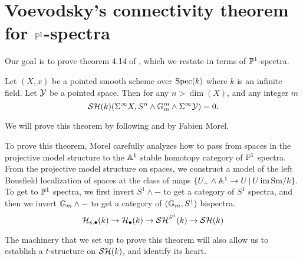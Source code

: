 \documentclass{amsart}%
\begin{document}
\section{Voevodsky's connectivity theorem for $\mathbb{P}^1$-spectra}

Our goal is to prove theorem 4.14 of \cite{Voev98}, which we restate
in terms of $\mathbb{P}^1$-spectra. 

\begin{theorem}
  \label{Voev}
  Let $(X,x)$ be a pointed smooth scheme over $\operatorname{Spec}(k)$ where $k$ is
  an infinite field. Let $\mathcal{Y}$ be a pointed space. Then for any
  $n > \dim(X)$, and any integer $m$
  \begin{equation*}
    \mathcal{SH}(k)(\Sigma^{\infty}X, S^n\wedge \mathbb{G}_m^m \wedge \Sigma^{\infty} \mathcal{Y}) = 0.
  \end{equation*}
\end{theorem}

We will prove this theorem by following \cite{Mor03} and \cite{Mor05}
by Fabien Morel.

\begin{remark}
  To prove this theorem, Morel carefully analyzes how to pass from
  spaces in the projective model structure to the $\mathbb{A}^1$ stable
  homotopy category of $\mathbb{P}^1$ spectra. From the projective model
  structure on spaces, we construct a model of the left Bousfield
  localization of spaces at the class of maps
  $\{ U_+ \wedge \mathbb{A}^1 \to U \, \vert \, U \operatorname{im} \mathrm{Sm}/k\}$. To get to $\mathbb{P}^1$
  spectra, we first invert $S^1 \wedge -$ to get a category of
  $S^1$ spectra, and then we invert $\mathbb{G}_m \wedge -$ to get a
  category of $(\mathbb{G}_m, S^1)$ bispectra.
  \begin{equation*}
    \mathcal{H}_{s,\bullet}(k) \to \mathcal{H}_{\bullet}(k) \to \mathcal{SH}^{S^1}(k) \to \mathcal{SH}(k)
  \end{equation*}

  The machinery that we set up to prove this theorem will also allow
  us to establish a $t$-structure on $\mathcal{SH}(k)$, and identify its heart.
\end{remark}
\end{document}
